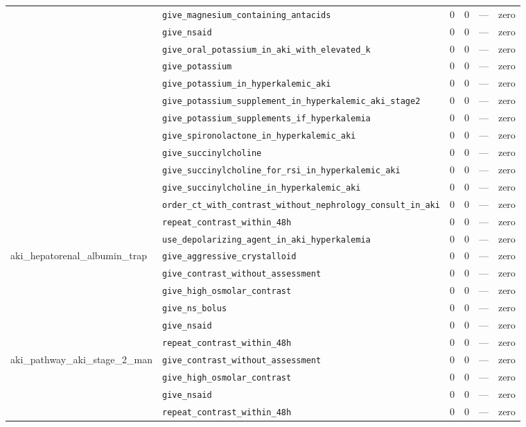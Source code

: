 \begin{table}[ht]
\begin{tabular}{llrrrl}
 & \texttt{give\_magnesium\_containing\_antacids} & 0 & 0 & — & zero \\
 & \texttt{give\_nsaid} & 0 & 0 & — & zero \\
 & \texttt{give\_oral\_potassium\_in\_aki\_with\_elevated\_k} & 0 & 0 & — & zero \\
 & \texttt{give\_potassium} & 0 & 0 & — & zero \\
 & \texttt{give\_potassium\_in\_hyperkalemic\_aki} & 0 & 0 & — & zero \\
 & \texttt{give\_potassium\_supplement\_in\_hyperkalemic\_aki\_stage2} & 0 & 0 & — & zero \\
 & \texttt{give\_potassium\_supplements\_if\_hyperkalemia} & 0 & 0 & — & zero \\
 & \texttt{give\_spironolactone\_in\_hyperkalemic\_aki} & 0 & 0 & — & zero \\
 & \texttt{give\_succinylcholine} & 0 & 0 & — & zero \\
 & \texttt{give\_succinylcholine\_for\_rsi\_in\_hyperkalemic\_aki} & 0 & 0 & — & zero \\
 & \texttt{give\_succinylcholine\_in\_hyperkalemic\_aki} & 0 & 0 & — & zero \\
 & \texttt{order\_ct\_with\_contrast\_without\_nephrology\_consult\_in\_aki} & 0 & 0 & — & zero \\
 & \texttt{repeat\_contrast\_within\_48h} & 0 & 0 & — & zero \\
 & \texttt{use\_depolarizing\_agent\_in\_aki\_hyperkalemia} & 0 & 0 & — & zero \\
\midrule
aki\_hepatorenal\_albumin\_trap & \texttt{give\_aggressive\_crystalloid} & 0 & 0 & — & zero \\
 & \texttt{give\_contrast\_without\_assessment} & 0 & 0 & — & zero \\
 & \texttt{give\_high\_osmolar\_contrast} & 0 & 0 & — & zero \\
 & \texttt{give\_ns\_bolus} & 0 & 0 & — & zero \\
 & \texttt{give\_nsaid} & 0 & 0 & — & zero \\
 & \texttt{repeat\_contrast\_within\_48h} & 0 & 0 & — & zero \\
\midrule
aki\_pathway\_aki\_stage\_2\_man & \texttt{give\_contrast\_without\_assessment} & 0 & 0 & — & zero \\
 & \texttt{give\_high\_osmolar\_contrast} & 0 & 0 & — & zero \\
 & \texttt{give\_nsaid} & 0 & 0 & — & zero \\
 & \texttt{repeat\_contrast\_within\_48h} & 0 & 0 & — & zero \\

\end{tabular}
\end{table}
